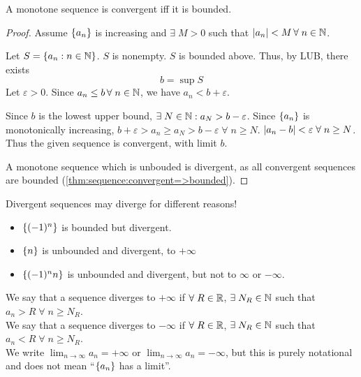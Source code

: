 \begin{thm} \label{thm:sequence:MCT}
    A monotone sequence is convergent iff it is bounded.
\end{thm}
\begin{proof}
    Assume $\set{a_{n}}$ is increasing and $\exists\; M > 0$ such that $\abs{a_{n}} < M \,\forall\; n \in \N$.

    Let $S = \set{a_{n} : n \in \N}$.
    $S$ is nonempty. $S$ is bounded above.
    Thus, by LUB, there exists \[
        b = \sup S
    \] Let $\varepsilon > 0$.
    Since $a_{n} \leq b \,\forall\; n \in \mathbb{N}$, we have $a_{n} < b + \varepsilon$.

    Since $b$ is the lowest upper bound, $\exists\; N \in \mathbb{N} : a_{N} > b - \varepsilon$.
    Since $\set{a_{n}}$ is monotonically increasing, $b + \varepsilon > a_{n} \geq a_{N} > b - \varepsilon \;\forall\; n \geq N$.
    $\abs{a_{n} - b} < \varepsilon \;\forall\; n \geq N$. Thus the given sequence is convergent, with limit $b$.

    A monotone sequence which is unbouded is divergent, as all convergent sequences are bounded (\cref{thm:sequence:convergent=>bounded}).
\end{proof}

\begin{rem}[Warning!]
    Divergent sequences may diverge for different reasons!
    \begin{itemize}
        \item $\set{(-1)^{n}}$ is bounded but divergent.
        \item $\set{n}$ is unbounded and divergent, to $+\infty$
        \item $\set{(-1)^{n}n}$ is unbounded and divergent, but not to $\infty$ or $-\infty$.
    \end{itemize}
\end{rem}
\begin{defn} \label{defn:sequence:diverging_to_infinity}
    We say that a sequence diverges to $+\infty$ if $\forall\; R \in \mathbb{R}$, $\exists\; N_{R} \in \mathbb{N}$ such that $a_{n} > R \;\forall\; n \geq N_{R}$. \\
    We say that a sequence diverges to $-\infty$ if $\forall\; R \in \mathbb{R}$, $\exists\; N_{R} \in \mathbb{N}$ such that $a_{n} < R \;\forall\; n \geq N_{R}$. \\
    We write $\lim_{n \to \infty} a_{n} = +\infty$ or $\lim_{n \to \infty} a_{n} = -\infty$, but this is purely notational and does not mean ``$\set{a_{n}}$ has a limit''.
\end{defn}
